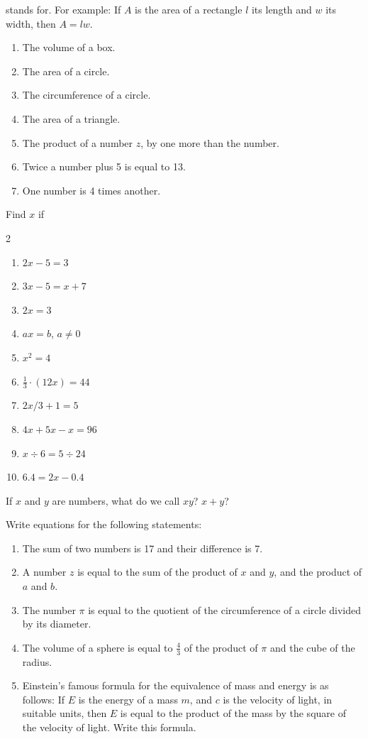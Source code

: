\documentclass[11pt]{book}
\theoremstyle{bkplain}
\theoremstyle{XIplainnote}
\theoremstyle{bkplain}
\theoremstyle{bkplain}
\begin{document}
\begin{exlist}
      stands for. For example: If $A$ is the area of a rectangle $l$ its length
      and $w$ its width, then $A = lw$.
  \begin{enumerate}[label=(\alph*), leftmargin=2.2em, itemsep=1pt, topsep=2pt]
  \item The volume of a box.
  \item The area of a circle.
  \item The circumference of a circle.
  \item The area of a triangle.
  \item The product of a number $z$, by one more than the number.
  \item Twice a number plus 5 is equal to 13.
  \item One number is 4 times another.
  \end{enumerate}
\item Find $x$ if
  \begin{multicols}{2}
  \begin{enumerate}[label=(\alph*), leftmargin=2.2em, itemsep=1pt, topsep=2pt]
  \item $2x - 5 = 3$
  \item $3x - 5 = x + 7$
  \item $2x = 3$
  \item $ax = b$, $a \neq 0$
  \item $x^2 = 4$
  \item $\frac{1}{3} \cdot (12x) = 44$
  \item $2x/3 + 1 = 5$
  \item $4x + 5x - x = 96$
  \item $x \div 6 = 5 \div 24$
  \item $6.4 = 2x - 0.4$
  \end{enumerate}
  \end{multicols}
\item If $x$ and $y$ are numbers, what do we call $xy$? $x + y$?
\item Write equations for the following statements:
  \begin{enumerate}[label=(\alph*), leftmargin=2.2em, itemsep=1pt, topsep=2pt]
  \item The sum of two numbers is 17 and their difference is 7.
  \item A number $z$ is equal to the sum of the product of $x$ and $y$, and the
        product of $a$ and $b$.
  \item The number $\pi$ is equal to the quotient of the circumference of a
        circle divided by its diameter.
  \item The volume of a sphere is equal to $\frac{4}{3}$ of the product of $\pi$
        and the cube of the radius.
  \item Einstein's famous formula for the equivalence of mass and energy is as
        follows: If $E$ is the energy of a mass $m$, and $c$ is the velocity of
        light, in suitable units, then $E$ is equal to the product of the mass by
        the square of the velocity of light. Write this formula.
  \end{enumerate}
\end{exlist}
\end{document}
